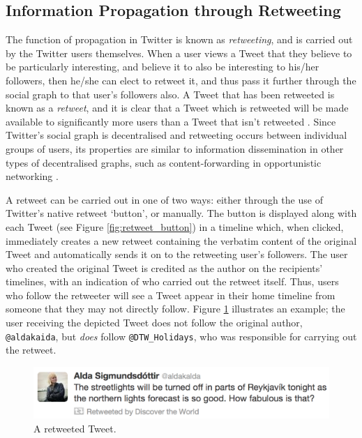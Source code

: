 \subsection{Information Propagation through Retweeting}
The function of propagation in Twitter is known as \textit{retweeting}, and is carried out by the Twitter users themselves. When a user views a Tweet that they believe to be particularly interesting, and believe it to also be interesting to his/her followers, then he/she can elect to retweet it, and thus pass it further through the social graph to that user's followers also. A Tweet that has been retweeted is known as a \textit{retweet}, and it is clear that a Tweet which is retweeted will be made available to significantly more users than a Tweet that isn't retweeted \cite{webberley11, kwak10}. Since Twitter's social graph is decentralised and retweeting occurs between individual groups of users, its properties are similar to information dissemination in other types of decentralised graphs, such as content-forwarding in opportunistic networking \cite{allen10}.

A retweet can be carried out in one of two ways: either through the use of Twitter's native retweet `button', or manually. The button is displayed along with each Tweet (see Figure \ref{fig:retweet_button}) in a timeline which, when clicked, immediately creates a new retweet containing the verbatim content of the original Tweet and automatically sends it on to the retweeting user's followers. The user who created the original Tweet is credited as the author on the recipients' timelines, with an indication of who carried out the retweet itself. Thus, users who follow the retweeter will see a Tweet appear in their home timeline from someone that they may not directly follow. Figure \ref{fig:northern_lights_tweet} illustrates an example; the user receiving the depicted Tweet does not follow the original author, \texttt{@aldakaida}, but \textit{does} follow \texttt{@DTW\_Holidays}, who was responsible for carrying out the retweet. 

\begin{figure}[h]
\centering
\includegraphics[scale=0.3]{2.Background/Media/northern_lights_tweet.png} 
\caption{A retweeted Tweet.}
\label{fig:northern_lights_tweet}
\end{figure}

